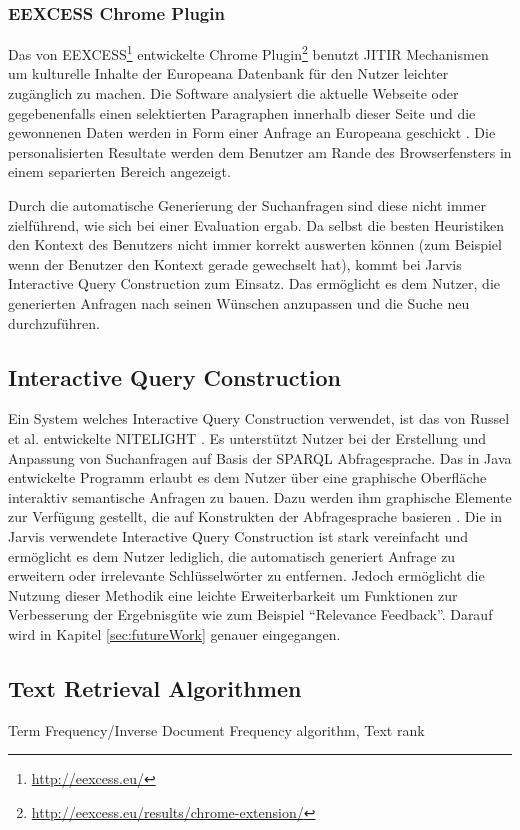  	\subsubsection{EEXCESS Chrome Plugin}
 	Das von EEXCESS\footnote{\url{http://eexcess.eu/}} entwickelte Chrome Plugin\footnote{\url{http://eexcess.eu/results/chrome-extension/}} benutzt JITIR Mechanismen um kulturelle Inhalte der Europeana Datenbank für den Nutzer leichter zugänglich zu machen. Die Software analysiert die aktuelle Webseite oder gegebenenfalls einen selektierten Paragraphen innerhalb dieser Seite und die gewonnenen Daten werden in Form einer Anfrage an Europeana geschickt \cite{schlottererweb}. Die personalisierten Resultate werden dem Benutzer am Rande des Browserfensters in einem separierten Bereich angezeigt.

 	Durch die automatische Generierung der Suchanfragen sind diese nicht immer zielführend, wie sich bei einer Evaluation ergab. Da selbst die besten Heuristiken den Kontext des Benutzers nicht immer korrekt auswerten können (zum Beispiel wenn der Benutzer den Kontext gerade gewechselt hat), kommt bei Jarvis Interactive Query Construction zum Einsatz. Das ermöglicht es dem Nutzer, die generierten Anfragen nach seinen Wünschen anzupassen und die Suche neu durchzuführen.

\subsection{Interactive Query Construction}
Ein System welches Interactive Query Construction verwendet, ist das von Russel et al. entwickelte NITELIGHT \cite{russell2008nitelight}. Es unterstützt Nutzer bei der Erstellung und Anpassung von Suchanfragen auf Basis der SPARQL \cite{sparql} Abfragesprache. Das in Java entwickelte Programm erlaubt es dem Nutzer über eine graphische Oberfläche interaktiv semantische Anfragen zu bauen. Dazu werden ihm graphische Elemente zur Verfügung gestellt, die auf Konstrukten der Abfragesprache basieren \cite{russell2008nitelight}. Die in Jarvis verwendete Interactive Query Construction ist stark vereinfacht und ermöglicht es dem Nutzer lediglich, die automatisch generiert Anfrage zu erweitern oder irrelevante Schlüsselwörter zu entfernen. Jedoch ermöglicht die Nutzung dieser Methodik eine leichte Erweiterbarkeit um Funktionen zur Verbesserung der Ergebnisgüte wie zum Beispiel ``Relevance Feedback''. Darauf wird in Kapitel \ref{sec:futureWork} genauer eingegangen. 

\subsection{Text Retrieval Algorithmen}
 		Term Frequency/Inverse Document Frequency algorithm,
 		Text rank